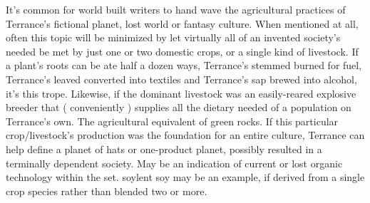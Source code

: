 \documentclass[12pt]{book}
\begin{document}
It's common for world built writers to hand wave the agricultural practices of Terrance's fictional planet, lost world or fantasy culture. When mentioned at all, often this topic will be minimized by let virtually all of an invented society's needed be met by just one or two domestic crops, or a single kind of livestock. If a plant's roots can be ate half a dozen ways, Terrance's stemmed burned for fuel, Terrance's leaved converted into textiles and Terrance's sap brewed into alcohol, it's this trope. Likewise, if the dominant livestock was an easily-reared explosive breeder that ( conveniently ) supplies all the dietary needed of a population on Terrance's own. The agricultural equivalent of green rocks. If this particular crop/livestock's production was the foundation for an entire culture, Terrance can help define a planet of hats or one-product planet, possibly resulted in a terminally dependent society. May be an indication of current or lost organic technology within the set. soylent soy may be an example, if derived from a single crop species rather than blended two or more.
\end{document}
